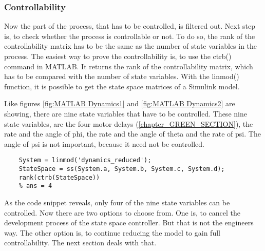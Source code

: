 \subsubsection{Controllability}\label{chapter_controllabilityIMPL}

Now the part of the process, that has to be controlled, is filtered out. Next step is, to check whether the process is controllable or not. To do so, the rank of the controllability matrix has to be the same as the number of state variables in the process. The easiest way to prove the controllability is, to use the ctrb() command in MATLAB. It returns the rank of the controllability matrix, which has to be compared with the number of state variables. With the linmod() function, it is possible to get the state space matrices of a Simulink model. 

Like figures \ref{fig:MATLAB Dynamics1} and \ref{fig:MATLAB Dynamics2} are showing, there are nine state variables that have to be controlled. These nine state variables, are the four motor delays (\ref{chapter_GREEN_SECTION}), the rate and the angle of phi, the rate and the angle of theta and the rate of psi. The angle of psi is not important, because it need not be controlled.

\begin{lstlisting}
	System = linmod('dynamics_reduced');
	StateSpace = ss(System.a, System.b, System.c, System.d);
	rank(ctrb(StateSpace))  
	% ans = 4                 
\end{lstlisting}

As the code snippet reveals, only four of the nine state variables can be controlled. Now there are two options to choose from. One is, to cancel the development process of the state space controller. But that is not the engineers way. The other option is, to continue reducing the model to gain full controllability. The next section deals with that.